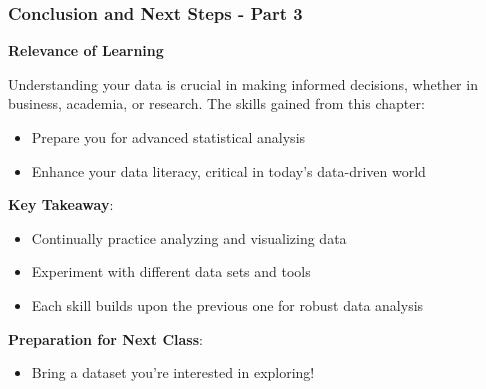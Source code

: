 \documentclass[aspectratio=169]{beamer}
\begin{document}
\begin{frame}[fragile]
    \frametitle{Conclusion and Next Steps - Part 3}
    \textbf{Relevance of Learning}
    
    Understanding your data is crucial in making informed decisions, whether in business, academia, or research. The skills gained from this chapter:
    
    \begin{itemize}
        \item Prepare you for advanced statistical analysis
        \item Enhance your data literacy, critical in today's data-driven world
    \end{itemize}
    
    \textbf{Key Takeaway}:
    \begin{itemize}
        \item Continually practice analyzing and visualizing data
        \item Experiment with different data sets and tools
        \item Each skill builds upon the previous one for robust data analysis
    \end{itemize}
    
    \textbf{Preparation for Next Class}:
    \begin{itemize}
        \item Bring a dataset you're interested in exploring!
    \end{itemize}
\end{frame}
\end{document}
